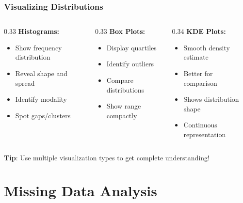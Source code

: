 \documentclass[aspectratio=169]{beamer}
\begin{document}
\begin{frame}
\frametitle{Visualizing Distributions}

\begin{columns}[T]
    \begin{column}{0.33\textwidth}
        \textbf{Histograms:}
        \begin{itemize}
            \item Show frequency distribution
            \item Reveal shape and spread
            \item Identify modality
            \item Spot gaps/clusters
        \end{itemize}
    \end{column}
    \begin{column}{0.33\textwidth}
        \textbf{Box Plots:}
        \begin{itemize}
            \item Display quartiles
            \item Identify outliers
            \item Compare distributions
            \item Show range compactly
        \end{itemize}
    \end{column}
    \begin{column}{0.34\textwidth}
        \textbf{KDE Plots:}
        \begin{itemize}
            \item Smooth density estimate
            \item Better for comparison
            \item Shows distribution shape
            \item Continuous representation
        \end{itemize}
    \end{column}
\end{columns}

\vspace{0.5cm}

\textbf{Tip}: Use multiple visualization types to get complete understanding!

\end{frame}

\section{Missing Data Analysis}
\end{document}
